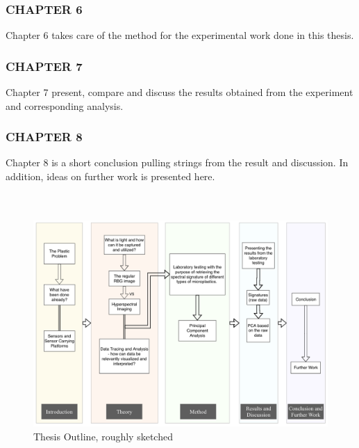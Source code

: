 \subsubsection*{CHAPTER 6} Chapter 6 takes care of the method for the experimental work done in this thesis.
\subsubsection*{CHAPTER 7} Chapter 7 present, compare and discuss the results obtained from the experiment and corresponding analysis.
\subsubsection*{CHAPTER 8} Chapter 8 is a short conclusion pulling strings from the result and discussion. In addition, ideas on further work is presented here.
\\\\\\
\begin{figure}[H]
  \includegraphics[width=\linewidth]{Images/thesisoutline.png}
  \caption{Thesis Outline, roughly sketched}
  \label{fig:outline}
\end{figure}


